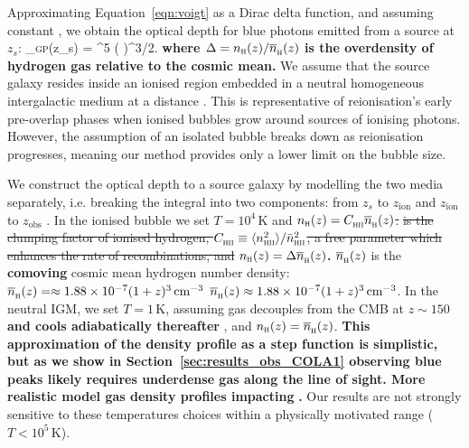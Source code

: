 \documentclass[fleqn,usenatbib]{mnras}
\providecommand{\DIFadd}[1]{{\protect\color{Green} {\bf #1}}} %
\providecommand{\DIFdel}[1]{{\protect\color{Gray} \scriptsize \sout{#1}}} %
\providecommand{\DIFaddbegin}{} %
\providecommand{\DIFaddend}{} %
\providecommand{\DIFdelbegin}{} %
\providecommand{\DIFdelend}{} %
\newcommand{\DIFscaledelfig}{0.5}
\newlength{\DIFdelgraphicswidth} %
\newlength{\DIFdelgraphicsheight} %
\newcommand{\DIFaddincludegraphics}[2][]{{\color{purple}\fbox{\DIFOincludegraphics[#1]{#2}}}} %
\newcommand{\DIFdelincludegraphics}[2][]{%
\sbox{\DIFdelgraphicsbox}{\DIFOincludegraphics[#1]{#2}}%
\settoboxwidth{\DIFdelgraphicswidth}{\DIFdelgraphicsbox} %
\settoboxtotalheight{\DIFdelgraphicsheight}{\DIFdelgraphicsbox} %
\scalebox{\DIFscaledelfig}{%
\parbox[b]{\DIFdelgraphicswidth}{\usebox{\DIFdelgraphicsbox}\\[-\baselineskip] \rule{\DIFdelgraphicswidth}{0em}}\llap{\resizebox{\DIFdelgraphicswidth}{\DIFdelgraphicsheight}{%
\setlength{\unitlength}{\DIFdelgraphicswidth}%
\begin{picture}(1,1)%
\thicklines\linethickness{2pt} %
{\color[rgb]{1,0,0}\put(0,0){\framebox(1,1){}}}%
{\color[rgb]{1,0,0}\put(0,0){\line( 1,1){1}}}%
{\color[rgb]{1,0,0}\put(0,1){\line(1,-1){1}}}%
\end{picture}%
}\hspace*{3pt}}} %
} %
\DeclareRobustCommand{\DIFaddbegin}{\DIFOaddbegin \let\includegraphics\DIFaddincludegraphics} %
\DeclareRobustCommand{\DIFaddend}{\DIFOaddend \let\includegraphics\DIFOincludegraphics} %
\DeclareRobustCommand{\DIFdelbegin}{\DIFOdelbegin \let\includegraphics\DIFdelincludegraphics} %
\DeclareRobustCommand{\DIFdelend}{\DIFOaddend \let\includegraphics\DIFOincludegraphics} %
\begin{document}
Approximating Equation~\eqref{eqn:voigt} as a Dirac delta function, and assuming constant \xHI, we obtain the \citet{Gunn1965} optical depth for blue photons emitted from a source at $z_s$:
%
\BE \label{eqn:tau_GP}
\tau_\textsc{gp}(z_s) =   ^5 \xHI \DIFaddbegin \DIFadd{\Delta }\DIFaddend \left(\DIFdelbegin \DIFdel{}%
\DIFdelend {}\right)^{3/2}.
\EE
%
\DIFaddbegin \DIFadd{where $\Delta=n_\textsc{h}(z)/\nh(z)$ is the overdensity of hydrogen gas relative to the cosmic mean. }\DIFaddend We assume that the source galaxy resides inside an ionised region embedded in a neutral homogeneous intergalactic medium at a distance \Rion. This is representative of reionisation's early pre-overlap phases when ionised bubbles grow around sources of ionising photons. However, the assumption of an isolated bubble breaks down as reionisation progresses, meaning our method provides only a lower limit on the bubble size.

We construct the optical depth to a source galaxy by modelling the two media separately, i.e. breaking the integral into two components: from $z_s$ to $z_\textrm{ion}$ and $z_\textrm{ion}$ to $z_\mathrm{obs}$ \citep[following,][]{Haiman2002,Cen2000,Mesinger2004}. In the ionised bubble we set $T=10^4$\,K \citep[appropriate for photoionised gas at the mean density, e.g.,][]{Hui1997} and \DIFdelbegin \DIFdel{$n_\textsc{h}(z) = \clump \nh(z)$. }%
\DIFdel{is the clumping factor of ionised hydrogen, $\clump \equiv \langle n_\HII^2\rangle / \bar n_\HII^2$, a free parameter which enhances the rate of recombinations, and }\DIFdelend \DIFaddbegin \DIFadd{$n_\textsc{h}(z) = \Delta \nh(z)$. }\DIFaddend $\nh(z)$ is the \DIFaddbegin \DIFadd{comoving }\DIFaddend cosmic mean hydrogen number density: \DIFdelbegin \DIFdel{$\nh(z) = \approx 1.88\times10^{-7} (1+z)^3\cm^{-3}$}\DIFdelend \DIFaddbegin \DIFadd{$\nh(z) \approx 1.88\times10^{-7} (1+z)^3\cm^{-3}$}\DIFaddend . In the neutral IGM, we set $T=1$\,K, assuming gas decouples from the CMB at $z\sim150$ \DIFaddbegin \DIFadd{and cools adiabatically thereafter }\DIFaddend \citep{Peebles1993}, and $n_\textsc{h}(z) = \nh(z)$. \DIFaddbegin \DIFadd{This approximation of the density profile as a step function is simplistic, but as we show in Section~\ref{sec:results_obs_COLA1} observing blue peaks likely requires underdense gas along the line of sight. More realistic model gas density profiles impacting }\lya \DIFadd{transmission are discussed by }\citet{Santos2004}\DIFadd{. }\DIFaddend Our results are not strongly sensitive to these temperatures choices within a physically motivated range ($T<10^5$\,K).
\end{document}
